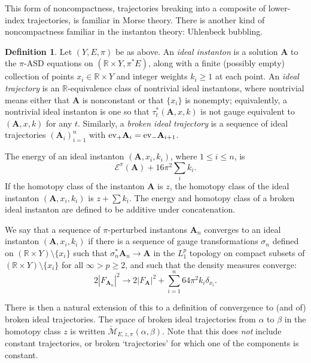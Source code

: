 \documentclass{memo-l}
\newcommand{\pE}{\pi^* \! E}
\theoremstyle{definition}
\newtheorem{definition}[theorem]{Definition}
\theoremstyle{remark}
\numberwithin{section}{chapter}
\numberwithin{equation}{chapter}
\begin{document}
This form of noncompactness, trajectories breaking into a composite of lower-index trajectories, is familiar in Morse theory. There is another kind of noncompactness familiar in the instanton theory: Uhlenbeck bubbling.

\begin{definition}Let $(Y,E,\pi)$ be as above. An \emph{ideal instanton} is a solution $\mathbf{A}$ to the $\pi$-ASD equations on $(\mathbb R \times Y, \pE)$, along with a finite (possibly empty) collection of points $x_i \in \mathbb R \times Y$ and integer weights $k_i \geq 1$ at each point. An \emph{ideal trajectory} is an $\mathbb R$-equivalence class of nontrivial ideal instantons, where nontrivial means either that $\mathbf{A}$ is nonconstant or that $\{x_i\}$ is nonempty; equivalently, a nontrivial ideal instanton is one so that $\tau_t^*(\mathbf{A},x,k)$ is not gauge equivalent to $(\mathbf{A},x,k)$ for any $t$. Similarly, a \emph{broken ideal trajectory} is a sequence of ideal trajectories $(\mathbf{A}_i)_{i=1}^n$ with $\textup{ev}_+ \mathbf{A}_i = \textup{ev}_- \mathbf{A}_{i+1}$.

The energy of an ideal instanton $(\mathbf{A},x_i,k_i)$, where $1 \leq i \leq n$, is 
$$\mathcal E^\pi(\mathbf{A}) + 16\pi^2 \sum_i k_i.$$ 
If the homotopy class of the instanton $\mathbf{A}$ is $z$, the homotopy class of the ideal instanton $(\mathbf{A},x_i,k_i)$ is $z + \sum k_i$. The energy and homotopy class of a broken ideal instanton are defined to be additive under concatenation.
\end{definition}

We say that a sequence of $\pi$-perturbed instantons $\mathbf{A}_n$ converges to an ideal instanton $(\mathbf{A},x_i,k_i)$ if there is a sequence of gauge transformations $\sigma_n$ defined on $(\mathbb R \times Y) \setminus \{x_i\}$ such that $\sigma_n^* \mathbf{A}_n \to \mathbf{A}$ in the $L^p_1$ topology on compact subsets of $(\mathbb R \times Y) \setminus \{x_i\}$ for all $\infty > p \geq 2$, and such that the density measures converge: 
$$2|F_{\mathbf{A}_n}|^2 \to 2|F_{\mathbf{A}}|^2 + \sum_{i=1}^n 64\pi^2 k_i \delta_{x_i}.$$

There is then a natural extension of this to a definition of convergence to (and of) broken ideal trajectories. The space of broken ideal trajectories from $\alpha$ to $\beta$ in the homotopy class $z$ is written $\check{\mathcal M}_{E,z,\pi}(\alpha, \beta)$. Note that this does \emph{not} include constant trajectories, or broken `trajectories' for which one of the components is constant.
\end{document}
